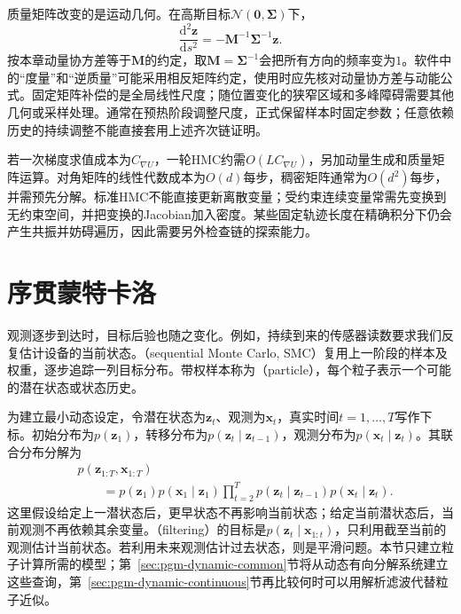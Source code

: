 质量矩阵改变的是运动几何。在高斯目标$\mathcal{N}(\bm{0},\bm{\Sigma})$下，
\[
  \frac{\mathrm{d}^2\bm{z}}{\mathrm{d}s^2}
     =-\bm{M}^{-1}\bm{\Sigma}^{-1}\bm{z}.
\]
按本章动量协方差等于$\bm{M}$的约定，取$\bm{M}=\bm{\Sigma}^{-1}$会把所有方向的频率变为$1$。软件中的“度量”和“逆质量”可能采用相反矩阵约定，使用时应先核对动量协方差与动能公式。固定矩阵补偿的是全局线性尺度；随位置变化的狭窄区域和多峰障碍需要其他几何或采样处理。通常在预热阶段调整尺度，正式保留样本时固定参数；任意依赖历史的持续调整不能直接套用上述齐次链证明。

若一次梯度求值成本为$C_{\nabla U}$，一轮HMC约需$O(L C_{\nabla U})$，另加动量生成和质量矩阵运算。对角矩阵的线性代数成本为$O(d)$每步，稠密矩阵通常为$O(d^2)$每步，并需预先分解。标准HMC不能直接更新离散变量；受约束连续变量常需先变换到无约束空间，并把变换的Jacobian加入密度。某些固定轨迹长度在精确积分下仍会产生共振并妨碍遍历，因此需要另外检查链的探索能力。

\section{序贯蒙特卡洛}
\label{sec:pgm-sampling-smc}

观测逐步到达时，目标后验也随之变化。例如，持续到来的传感器读数要求我们反复估计设备的当前状态。（sequential Monte Carlo, SMC）复用上一阶段的样本及权重，逐步追踪一列目标分布。带权样本称为（particle），每个粒子表示一个可能的潜在状态或状态历史。

为建立最小动态设定，令潜在状态为$\bm{z}_t$、观测为$\bm{x}_t$，真实时间$t=1,\ldots,T$写作下标。初始分布为$p(\bm{z}_1)$，转移分布为$p(\bm{z}_t\mid\bm{z}_{t-1})$，观测分布为$p(\bm{x}_t\mid\bm{z}_t)$。其联合分布分解为
\begin{equation}
  \begin{aligned}
    &p(\bm{z}_{1:T},\bm{x}_{1:T})\\
    &\qquad=p(\bm{z}_1)p(\bm{x}_1\mid\bm{z}_1)
       \prod_{t=2}^{T}
         p(\bm{z}_t\mid\bm{z}_{t-1})p(\bm{x}_t\mid\bm{z}_t).
  \end{aligned}
  \label{eq:pgm-sampling-state-space}
\end{equation}
这里假设给定上一潜状态后，更早状态不再影响当前状态；给定当前潜状态后，当前观测不再依赖其余变量。（filtering）的目标是$p(\bm{z}_t\mid\bm{x}_{1:t})$，只利用截至当前的观测估计当前状态。若利用未来观测估计过去状态，则是平滑问题。本节只建立粒子计算所需的模型；第~\ref{sec:pgm-dynamic-common}节将从动态有向分解系统建立这些查询，第~\ref{sec:pgm-dynamic-continuous}节再比较何时可以用解析滤波代替粒子近似。

